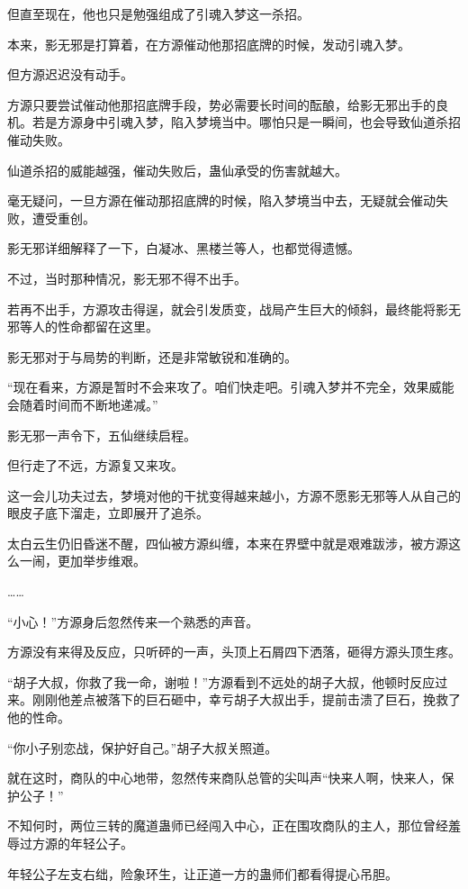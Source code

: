 \begin{this_body}
但直至现在，他也只是勉强组成了引魂入梦这一杀招。

本来，影无邪是打算着，在方源催动他那招底牌的时候，发动引魂入梦。

但方源迟迟没有动手。

方源只要尝试催动他那招底牌手段，势必需要长时间的酝酿，给影无邪出手的良机。若是方源身中引魂入梦，陷入梦境当中。哪怕只是一瞬间，也会导致仙道杀招催动失败。

仙道杀招的威能越强，催动失败后，蛊仙承受的伤害就越大。

毫无疑问，一旦方源在催动那招底牌的时候，陷入梦境当中去，无疑就会催动失败，遭受重创。

影无邪详细解释了一下，白凝冰、黑楼兰等人，也都觉得遗憾。

不过，当时那种情况，影无邪不得不出手。

若再不出手，方源攻击得逞，就会引发质变，战局产生巨大的倾斜，最终能将影无邪等人的性命都留在这里。

影无邪对于与局势的判断，还是非常敏锐和准确的。

“现在看来，方源是暂时不会来攻了。咱们快走吧。引魂入梦并不完全，效果威能会随着时间而不断地递减。”

影无邪一声令下，五仙继续启程。

但行走了不远，方源复又来攻。

这一会儿功夫过去，梦境对他的干扰变得越来越小，方源不愿影无邪等人从自己的眼皮子底下溜走，立即展开了追杀。

太白云生仍旧昏迷不醒，四仙被方源纠缠，本来在界壁中就是艰难跋涉，被方源这么一闹，更加举步维艰。

……

“小心！”方源身后忽然传来一个熟悉的声音。

方源没有来得及反应，只听砰的一声，头顶上石屑四下洒落，砸得方源头顶生疼。

“胡子大叔，你救了我一命，谢啦！”方源看到不远处的胡子大叔，他顿时反应过来。刚刚他差点被落下的巨石砸中，幸亏胡子大叔出手，提前击溃了巨石，挽救了他的性命。

“你小子别恋战，保护好自己。”胡子大叔关照道。

就在这时，商队的中心地带，忽然传来商队总管的尖叫声“快来人啊，快来人，保护公子！”

不知何时，两位三转的魔道蛊师已经闯入中心，正在围攻商队的主人，那位曾经羞辱过方源的年轻公子。

年轻公子左支右绌，险象环生，让正道一方的蛊师们都看得提心吊胆。


\end{this_body}
